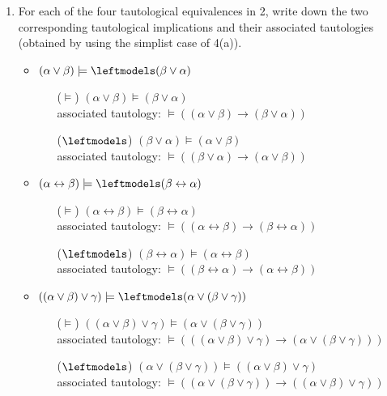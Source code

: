 \documentclass[11pt]{article}
\newcommand{\n}{\vspace{0.5cm}}
\begin{document}
\begin{enumerate}
    \item For each of the four tautological equivalences in 2, write down the two corresponding tautological implications and their associated tautologies (obtained by using the simplist case of 4(a)).
      \begin{itemize}
        \item \((\alpha \vee \beta) \models \leftmodels (\beta \vee \alpha)\)
          \begin{enumerate}
            \item[(\(\models\))] \((\alpha \vee \beta) \models (\beta \vee \alpha)\)\\ associated tautology: \(\models ((\alpha \vee \beta) \to (\beta \vee \alpha))\)
            \item[(\(\leftmodels\))] \((\beta \vee \alpha) \models (\alpha \vee \beta)\)\\ associated tautology: \(\models ((\beta \vee \alpha) \to (\alpha \vee \beta))\)
          \end{enumerate} \n

        \item \((\alpha \leftrightarrow \beta) \models \leftmodels (\beta \leftrightarrow \alpha)\)
          \begin{enumerate}
            \item[(\(\models\))] \((\alpha \leftrightarrow \beta) \models (\beta \leftrightarrow \alpha)\)\\ associated tautology: \(\models ((\alpha \leftrightarrow \beta) \to (\beta \leftrightarrow \alpha))\)
            \item[(\(\leftmodels\))] \((\beta \leftrightarrow \alpha) \models (\alpha \leftrightarrow \beta)\)\\ associated tautology: \(\models ((\beta \leftrightarrow \alpha) \to (\alpha \leftrightarrow \beta))\)
          \end{enumerate} \n

        \item \(((\alpha \vee \beta) \vee \gamma) \models \leftmodels (\alpha \vee (\beta \vee \gamma))\)
          \begin{enumerate}
            \item[(\(\models\))] \(((\alpha \vee \beta) \vee \gamma) \models (\alpha \vee (\beta \vee \gamma))\)\\ associated tautology: \(\models (((\alpha \vee \beta) \vee \gamma) \to (\alpha \vee (\beta \vee \gamma)))\)
            \item[(\(\leftmodels\))] \((\alpha \vee (\beta \vee \gamma)) \models ((\alpha \vee \beta) \vee \gamma)\)\\ associated tautology: \(\models ((\alpha \vee (\beta \vee \gamma)) \to ((\alpha \vee \beta) \vee \gamma))\)
          \end{enumerate} \n


\end{itemize}
\end{enumerate}
\end{document}

